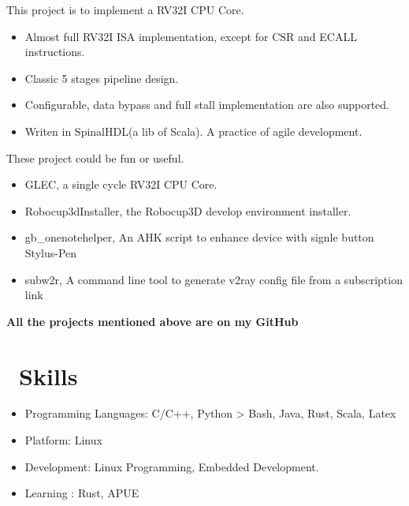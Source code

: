 \documentclass{resume}
\begin{document}
This project is to implement a RV32I CPU Core. 

\begin{itemize}
  \item Almost full RV32I ISA implementation, except for CSR and ECALL instructions.
  \item Classic 5 stages pipeline design.
  \item Configurable, data bypass and full stall implementation are also supported.
  \item Writen in SpinalHDL(a lib of Scala). A practice of agile development.
\end{itemize}


These project could be fun or useful.

\begin{itemize}
  \item GLEC, a single cycle RV32I CPU Core.
  \item Robocup3dInstaller, the Robocup3D develop environment installer.
  \item gb\_onenotehelper, An AHK script to enhance device with signle button Stylus-Pen 
  \item subw2r, A command line tool to generate v2ray config file from a subscription link
\end{itemize}

\textbf{All the projects mentioned above are on my GitHub}



\section{\faCogs\ Skills}
\begin{itemize}[parsep=0.5ex]
  \item Programming Languages: C/C++, Python > Bash, Java, Rust, Scala, Latex
  \item Platform: Linux
  \item Development: Linux Programming, Embedded Development.
  \item Learning : Rust, APUE
\end{itemize}
\end{document}
